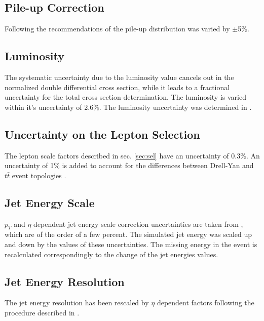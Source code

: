\subsection{Pile-up Correction}

Following the recommendations of \cite{TWikiSystPU} the
pile-up distribution was varied by $\pm$5\%.

\subsection{Luminosity}

The systematic uncertainty due to the luminosity value cancels out in the normalized double differential cross section,
while it leads to a fractional uncertainty for the total cross section determination. The luminosity is varied within it's uncertainty of 2.6\%. 
The luminosity uncertainty was determined in \cite{CMS-PAS-LUM-13-001}.

\subsection{Uncertainty on the Lepton Selection}

The lepton scale factors described in sec. \ref{sec:sel} have an uncertainty of 0.3\%\cite{Asin2014Auth}. An uncertainty of 1\% is added to account for
the differences between Drell-Yan and $t\bar{t}$ event topologies \cite{AN-2012-389}.

\subsection{Jet Energy Scale}

$p_{T}$ and $\eta$ dependent jet energy scale correction uncertainties are taken from \cite{CMS-PAS-JME-10-010}, which are of the
order of a few percent. The simulated jet energy was scaled up and down by the values of these uncertainties. The missing energy in the 
event is recalculated correspondingly to the change of the jet energies values.

\subsection{Jet Energy Resolution}

The jet energy resolution has been rescaled by $\eta$ dependent factors following the procedure described in \cite{TWikiSystJER}.


